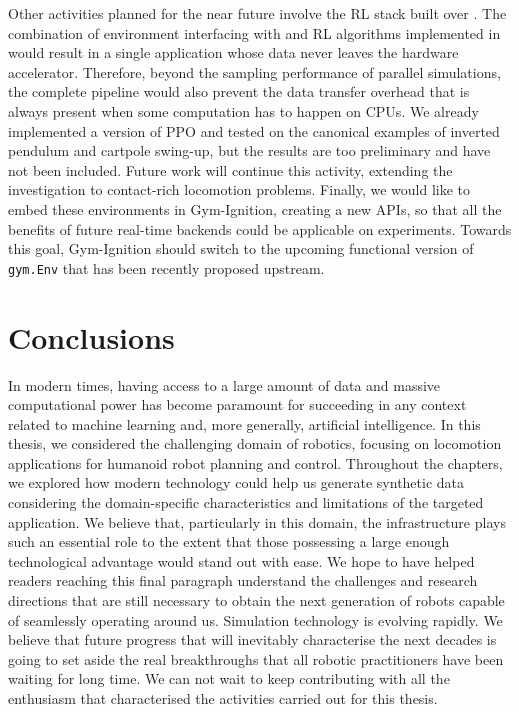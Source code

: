 Other activities planned for the near future involve the \ac{RL} stack built over \jaxsim.
The combination of environment interfacing with \jaxsim and \ac{RL} algorithms implemented in \jax would result in a single application whose data never leaves the hardware accelerator.
Therefore, beyond the sampling performance of parallel simulations, the complete pipeline would also prevent the data transfer overhead that is always present when some computation has to happen on \acp{CPU}.
We already implemented a \jax version of \ac{PPO} and tested on the canonical examples of inverted pendulum and cartpole swing-up, but the results are too preliminary and have not been included.
Future work will continue this activity, extending the investigation to contact-rich locomotion problems.
Finally, we would like to embed these environments in Gym-Ignition, creating a 	new \jaxsim \scenario \acp{API}, so that all the benefits of future real-time backends could be applicable on \jaxsim experiments.
Towards this goal, Gym-Ignition should switch to the upcoming functional version of \verb|gym.Env| that has been recently proposed upstream. 

\vfill
\section*{Conclusions}

In modern times, having access to a large amount of data and massive computational power has become paramount for succeeding in any context related to machine learning and, more generally, artificial intelligence.
In this thesis, we considered the challenging domain of robotics, focusing on locomotion applications for humanoid robot planning and control.
Throughout the chapters, we explored how modern technology could help us generate synthetic data considering the domain-specific characteristics and limitations of the targeted application.
We believe that, particularly in this domain, the infrastructure plays such an essential role to the extent that those possessing a large enough technological advantage would stand out with ease.
We hope to have helped readers reaching this final paragraph understand the challenges and research directions that are still necessary to obtain the next generation of robots capable of seamlessly operating around us.
Simulation technology is evolving rapidly.
We believe that future progress that will inevitably characterise the next decades is going to set aside the real breakthroughs that all robotic practitioners have been waiting for long time.
We can not wait to keep contributing with all the enthusiasm that characterised the activities carried out for this thesis.
